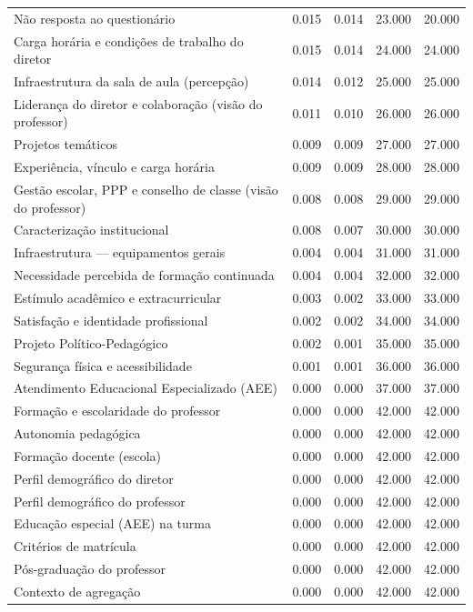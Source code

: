\begin{tabular}{lrrrr}
Não resposta ao questionário & 0.015 & 0.014 & 23.000 & 20.000 \\
Carga horária e condições de trabalho do diretor & 0.015 & 0.014 & 24.000 & 24.000 \\
Infraestrutura da sala de aula (percepção) & 0.014 & 0.012 & 25.000 & 25.000 \\
Liderança do diretor e colaboração (visão do professor) & 0.011 & 0.010 & 26.000 & 26.000 \\
Projetos temáticos & 0.009 & 0.009 & 27.000 & 27.000 \\
Experiência, vínculo e carga horária & 0.009 & 0.009 & 28.000 & 28.000 \\
Gestão escolar, PPP e conselho de classe (visão do professor) & 0.008 & 0.008 & 29.000 & 29.000 \\
Caracterização institucional & 0.008 & 0.007 & 30.000 & 30.000 \\
Infraestrutura — equipamentos gerais & 0.004 & 0.004 & 31.000 & 31.000 \\
Necessidade percebida de formação continuada & 0.004 & 0.004 & 32.000 & 32.000 \\
Estímulo acadêmico e extracurricular & 0.003 & 0.002 & 33.000 & 33.000 \\
Satisfação e identidade profissional & 0.002 & 0.002 & 34.000 & 34.000 \\
Projeto Político-Pedagógico & 0.002 & 0.001 & 35.000 & 35.000 \\
Segurança física e acessibilidade & 0.001 & 0.001 & 36.000 & 36.000 \\
Atendimento Educacional Especializado (AEE) & 0.000 & 0.000 & 37.000 & 37.000 \\
Formação e escolaridade do professor & 0.000 & 0.000 & 42.000 & 42.000 \\
Autonomia pedagógica & 0.000 & 0.000 & 42.000 & 42.000 \\
Formação docente (escola) & 0.000 & 0.000 & 42.000 & 42.000 \\
Perfil demográfico do diretor & 0.000 & 0.000 & 42.000 & 42.000 \\
Perfil demográfico do professor & 0.000 & 0.000 & 42.000 & 42.000 \\
Educação especial (AEE) na turma & 0.000 & 0.000 & 42.000 & 42.000 \\
Critérios de matrícula & 0.000 & 0.000 & 42.000 & 42.000 \\
Pós-graduação do professor & 0.000 & 0.000 & 42.000 & 42.000 \\
Contexto de agregação & 0.000 & 0.000 & 42.000 & 42.000 \\
\bottomrule
\end{tabular}
